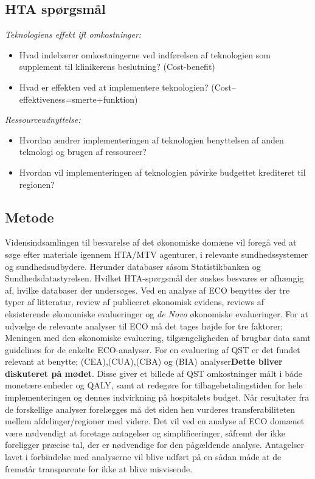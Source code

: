\subsection{HTA spørgsmål}
\textit{Teknologiens effekt ift omkostninger:}
\begin{itemize}
	\item Hvad indebærer omkostningerne ved indførelsen af teknologien som supplement til klinikerens beslutning? (Cost-benefit) %
	\item Hvad er effekten ved at implementere teknologien? (Cost–effektiveness=smerte+funktion) %
\end{itemize}

\textit{Ressourceudnyttelse:}
\begin{itemize}
	\item Hvordan ændrer implementeringen af teknologien benyttelsen af anden teknologi og brugen af ressourcer?%
	\item Hvordan vil implementeringen af teknologien påvirke budgettet krediteret til regionen? %
\end{itemize}

\subsection{Metode \citep{HTAcore}}
Vidensindsamlingen til besvarelse af det økonomiske domæne vil foregå ved at søge efter materiale igennem HTA/MTV agenturer, i relevante sundhedssystemer og sundhedsudbydere. Herunder databaser såsom Statistikbanken og Sundhedsdatastyrelsen. Hvilket HTA-spørgsmål der ønskes besvares er afhængig af, hvilke databaser der undersøges. Ved en analyse af ECO benyttes der tre typer af litteratur, review af publiceret økonomisk evidens, reviews af eksisterende økonomiske evalueringer og \textit{de Novo} økonomiske evalueringer. For at udvælge de relevante analyser til ECO må det tages højde for tre faktorer; Meningen med den økonomiske evaluering, tilgængeligheden af brugbar data samt guidelines for de enkelte ECO-analyser. For en evaluering af QST er det fundet relevant at benytte; (CEA),(CUA),(CBA) og (BIA) analyser\textbf{Dette bliver diskuteret på mødet}. Disse giver et billede af QST omkostninger målt i både monetære enheder og QALY, samt at redegøre for tilbagebetalingstiden for hele implementeringen og dennes indvirkning på hospitalets budget. Når resultater fra de forskellige analyser forelægges må det siden hen vurderes transferabiliteten mellem afdelinger/regioner med videre. Det vil ved en analyse af ECO domænet være nødvendigt at foretage antagelser og simplificeringer, såfremt der ikke foreligger præcise tal, der er nødvendige for den pågældende analyse. Antagelser lavet i forbindelse med analyserne vil blive udført på en sådan måde at de fremstår transparente for ikke at blive misvisende. 


